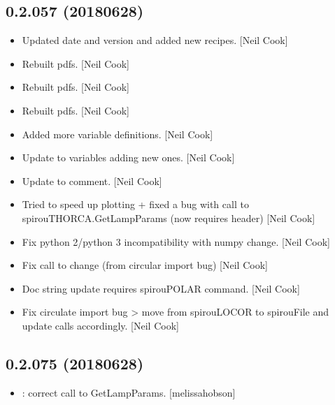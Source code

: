 \documentclass[a4paper,10pt,english]{report}
\begin{document}
\subsection{0.2.057 (2018\sphinxhyphen{}06\sphinxhyphen{}28)}
\label{\detokenize{misc/changelog:id426}}\begin{itemize}
\item {} 
Updated date and version and added new recipes. {[}Neil Cook{]}

\item {} 
Rebuilt pdfs. {[}Neil Cook{]}

\item {} 
Rebuilt pdfs. {[}Neil Cook{]}

\item {} 
Rebuilt pdfs. {[}Neil Cook{]}

\item {} 
Added more variable definitions. {[}Neil Cook{]}

\item {} 
Update to variables \sphinxhyphen{} adding new ones. {[}Neil Cook{]}

\item {} 
Update to comment. {[}Neil Cook{]}

\item {} 
Tried to speed up plotting + fixed a bug with call to
spirouTHORCA.GetLampParams (now requires header) {[}Neil Cook{]}

\item {} 
Fix python 2/python 3 incompatibility with numpy change. {[}Neil Cook{]}

\item {} 
Fix call to  change (from circular import bug) {[}Neil Cook{]}

\item {} 
Doc string update \sphinxhyphen{} requires spirouPOLAR command. {[}Neil Cook{]}

\item {} 
Fix circulate import bug \textendash{}\textgreater{} move  from spirouLOCOR to
spirouFile and update calls accordingly. {[}Neil Cook{]}

\end{itemize}


\subsection{0.2.075 (2018\sphinxhyphen{}06\sphinxhyphen{}28)}
\label{\detokenize{misc/changelog:id427}}\begin{itemize}
\item {} 
: correct call to GetLampParams. {[}melissa\sphinxhyphen{}hobson{]}

\end{itemize}
\end{document}
